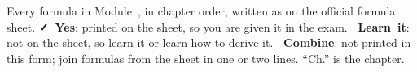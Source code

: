 \label{fg:chap}

\newcommand\fgYes{\textcolor{hscformula}{\footnotesize\bfseries\faCheck~Yes}}
\newcommand\fgNo{\textcolor{hscmistake}{\footnotesize\bfseries\faTimes~Learn~it}}
\newcommand\fgComb{\textcolor{hsctiptext}{\footnotesize\bfseries\faLink~Combine}}
\newcommand\fgf[1]{\raisebox{0pt}[\dimexpr\height+1.8pt\relax][\dimexpr\depth+1.8pt\relax]{#1}}
\newcommand\fgrow[4]{\fgf{#2} & #3 & #1 & #4\\\hline}
\newcommand\fgrowii[5]{\fgf{#2}\newline\fgf{#3} & #4 & #1 & #5\\\hline}
\newcommand\fgnext{\noalign{\vskip-0.4pt{\color{hscbrand!45}\hrule height 0.9pt}}}
\newcommand\fgch[1]{\hyperref[ch#1:chap]{\textbf{#1}}}
\newcommand\fggroup[1]{\multicolumn{4}{@{}l@{}}{\rule[-1.0ex]{0pt}{3.7ex}\normalsize
  {\bfseries\color{hscbrand}#1}}\\\hline}
\newcommand\fghead{\colhead{Formula} & \colhead{What it is for} & \colhead{Sheet} &
  \colhead{Ch.}}

Every formula in Module~\modulenumber, in chapter order, written as on the official formula
sheet. \fgYes: printed on the sheet, so you are given it in the exam. \fgNo: not on the
sheet, so learn it or learn how to derive it. \fgComb: not printed in this form; join
formulas from the sheet in one or two lines. ``Ch.'' is the chapter.

